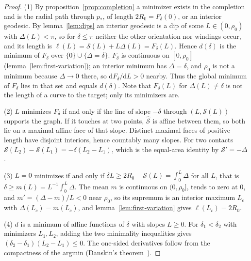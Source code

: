 \documentclass[aip,jmp,amsmath,amssymb,reprint]{revtex4-2}
\newcommand{\dd}{\mathrm{d}}
\theoremstyle{plain}
\theoremstyle{definition}
\begin{document}
\begin{proof}
(1) By proposition~\ref{prop:completion} a minimizer exists in the completion and is the
radial path through $p_*$, of length $2R_0=F_\delta(0)$, or an interior geodesic. By
lemma~\ref{lem:dips} an interior geodesic is a dip of some $L\in(0,\rho_0)$ with
$\Delta(L)<\pi$, so for $\delta\le\pi$ neither the other orientation nor windings occur, and
its length is $\ell(L)=\mathcal S(L)+L\Delta(L)=F_\delta(L)$. Hence $d(\delta)$ is the minimum of
$F_\delta$ over $\{0\}\cup\{\Delta=\delta\}$. $F_\delta$ is continuous on $[0,\rho_0]$
(lemma~\ref{lem:first-variation}); an interior minimum has $\Delta=\delta$, and $\rho_0$ is not a
minimum because $\Delta\to0$ there, so $\dd F_\delta/\dd L>0$ nearby. Thus the global minimum
of $F_\delta$ lies in that set and equals $d(\delta)$. Note that $F_\delta(L)$ for
$\Delta(L)\neq\delta$ is not the length of a curve to the target; only its minimizers are.

(2) $L$ minimizes $F_\delta$ if and only if the line of slope $-\delta$ through $(L,\mathcal S(L))$
supports the graph. If it touches at two points, $\hat{\mathcal S}$ is affine between them, so
both lie on a maximal affine face of that slope. Distinct maximal faces of positive length
have disjoint interiors, hence countably many slopes. For two contacts
$\mathcal S(L_2)-\mathcal S(L_1)=-\delta(L_2-L_1)$, which is the equal-area identity by
$\mathcal S'=-\Delta$.

(3) $L=0$ minimizes if and only if $\delta L\ge2R_0-\mathcal S(L)=\int_0^L\Delta$ for all $L$,
that is $\delta\ge m(L)=L^{-1}\int_0^L\Delta$. The mean $m$ is continuous on $(0,\rho_0]$, tends
to zero at $0$, and $m'=(\Delta-m)/L<0$ near $\rho_0$, so its supremum is an interior maximum
$L_c$ with $\Delta(L_c)=m(L_c)$, and lemma~\ref{lem:first-variation} gives $\ell(L_c)=2R_0$.

(4) $d$ is a minimum of affine functions of $\delta$ with slopes $L\ge0$. For $\delta_1<\delta_2$
with minimizers $L_1,L_2$, adding the two minimality inequalities gives
$(\delta_2-\delta_1)(L_2-L_1)\le0$. The one-sided derivatives follow from the compactness of the
argmin (Danskin's theorem~\cite{Danskin1966}).


\end{proof}
\end{document}
